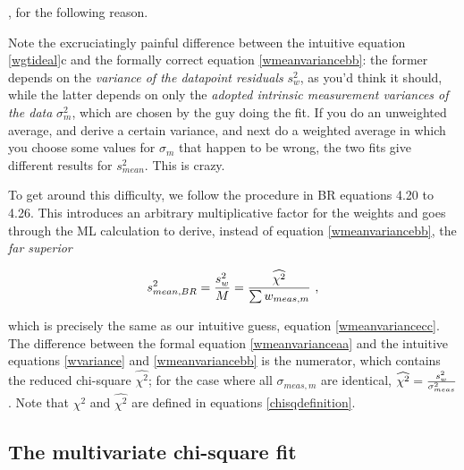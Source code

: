 \documentclass[psfig,preprint]{aastex}
\begin{document}
, for the following reason.

        Note the excruciatingly painful difference between the intuitive
equation \ref{wgtideal}c and the formally correct equation
\ref{wmeanvariancebb}: the former depends on the {\it variance of the
datapoint residuals} $s_w^2$, as you'd think it should, while the latter
depends on only the {\it adopted intrinsic measurement variances of the
data} $\sigma_{m}^2$, which are chosen by the guy doing the fit.  If you
do an unweighted average, and derive a certain variance, and next do a
weighted average in which you choose some values for $\sigma_{m}$ that
happen to be wrong, the two fits give different results for
$s_{mean}^2$.  This is crazy. 

        To get around this difficulty, we follow the procedure in BR
equations 4.20 to 4.26. This introduces an arbitrary multiplicative
factor for the weights and goes through the ML calculation to derive,
instead of equation \ref{wmeanvariancebb}, the {\it far superior}

\begin{equation} \label{wmeanvarianceaa}
s_{mean,BR}^2 = {s_w^2 \over M} = {\widehat{\chi^2} \over \sum w_{meas,m}} \ ,
\end{equation}

\noindent which is precisely the same as our intuitive guess, equation
\ref{wmeanvariancecc}.  The difference between the formal equation
\ref{wmeanvarianceaa} and the intuitive equations \ref{wvariance} and
\ref{wmeanvariancebb} is the numerator, which contains the reduced
chi-square $\widehat{\chi^2}$; for the case where all $\sigma_{meas,m}$
are identical, $\widehat{\chi^2} = {s_w^2 \over \sigma_{meas}^2}$. 
Note that $\chi^2$ and $\widehat{\chi^2}$ are defined in equations
\ref{chisqdefinition}. 

\subsection{The multivariate chi-square fit}
\label{sectionchisq}
\end{document}
